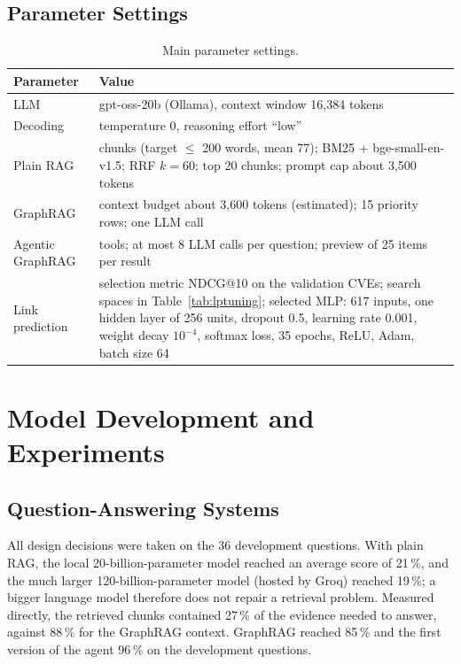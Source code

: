 \documentclass[12pt, a4paper]{article}
\begin{document}
\subsection{Parameter Settings}
\begin{table}[H]\centering\caption{Main parameter settings.}\label{tab:params}
\begin{tabularx}{\textwidth}{>{\raggedright\arraybackslash}p{4.4cm}>{\raggedright\arraybackslash}X}\toprule
\textbf{Parameter} & \textbf{Value} \\ \midrule
LLM & gpt-oss-20b (Ollama), context window 16,384 tokens \\
Decoding & temperature 0, reasoning effort ``low'' \\
Plain RAG & chunks (target $\leq$ 200 words, mean 77); BM25 + bge-small-en-v1.5; RRF $k=60$; top 20 chunks; prompt cap about 3,500 tokens \\
GraphRAG & context budget about 3,600 tokens (estimated); 15 priority rows; one LLM call \\
Agentic GraphRAG & 6 tools; at most 8 LLM calls per question; preview of 25 items per result \\
Link prediction & selection metric NDCG@10 on the validation CVEs; search spaces in Table~\ref{tab:lptuning}; selected MLP: 617 inputs, one hidden layer of 256 units, dropout 0.5, learning rate 0.001, weight decay $10^{-4}$, softmax loss, 35 epochs, ReLU, Adam, batch size 64 \\ \bottomrule
\end{tabularx}
\end{table}

\section{Model Development and Experiments}
\subsection{Question-Answering Systems}
All design decisions were taken on the 36 development questions. With plain RAG, the local 20-billion-parameter model reached an average score of 21\,\%, and the much larger 120-billion-parameter model (hosted by Groq) reached 19\,\%; a bigger language model therefore does not repair a retrieval problem. Measured directly, the retrieved chunks contained 27\,\% of the evidence needed to answer, against 88\,\% for the GraphRAG context. GraphRAG reached 85\,\% and the first version of the agent 96\,\% on the development questions.
\end{document}
